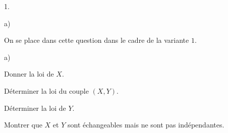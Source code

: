\documentclass[11pt]{article}%
\begin{document}
\begin{noliste}{1.}
\begin{noliste}{a)}
\end{noliste}
\item On se place dans cette question dans le cadre de la variante $1$.
\begin{noliste}{a)}
\item Donner la loi de $X$.






\item Déterminer la loi du couple $(X,Y)$.




\item Déterminer la loi de $Y$.




\item Montrer que $X$ et $Y$ sont échangeables mais ne sont pas 
indépendantes.



\end{noliste}
\end{noliste}
\end{document}
